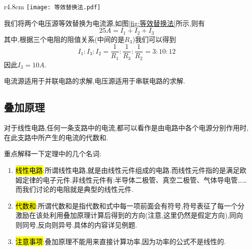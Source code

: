 \begin{wrapfigure}{r}{4.8cm}
    \centering
    \texttt{[image: 等效替换法.pdf]}
    \caption{}
    \label{fig:等效替换法}
\end{wrapfigure}
\begin{solution}
    我们将两个电压源等效替换为电流源,如图\ref{fig:等效替换法}所示,则有
    \begin{equation*}
        25A=I_1+I_2+I_3
    \end{equation*}
    其中,根据三个电阻的阻值关系(中间的是$R_3$)我们可以得到
    \begin{equation*}
        I_1:I_3:I_2=\frac{1}{R_1}:\frac{1}{R_3}:\frac{1}{R_2}=3:10:12
    \end{equation*}
    因此$I_3=10A$.
\end{solution}
\begin{remark}
    电流源适用于并联电路的求解,电压源适用于串联电路的求解.
\end{remark}

\subsection{\K 叠加原理}

\begin{theorem}[叠加原理]
    对于线性电路,任何一条支路中的电流,都可以看作是由电路中各个电源分别作用时,在此支路中所产生的电流的代数和.
\end{theorem}
\Par 重点解释一下定理中的几个名词:
\begin{enumerate}
    \item \hl{线性电路}:所谓线性电路,就是由线性元件组成的电路.而线性元件指的是满足欧姆定律的电子元件.非线性元件有:半导体二极管、真空二极管、气体导电管……而我们讨论的电阻就是典型的线性元件.
    \item \hl{代数和}:所谓代数和是指代数和式中每一项前面会有符号,符号表征了每一个分激励在该处利用叠加原理计算后得到的方向(注意,这里仍然是假定方向),同向则同号,反向则异号.具体的内容详见例题.
    \item \hl{注意事项}:叠加原理不能用来直接计算功率,因为功率的公式不是线性的.
\end{enumerate}

